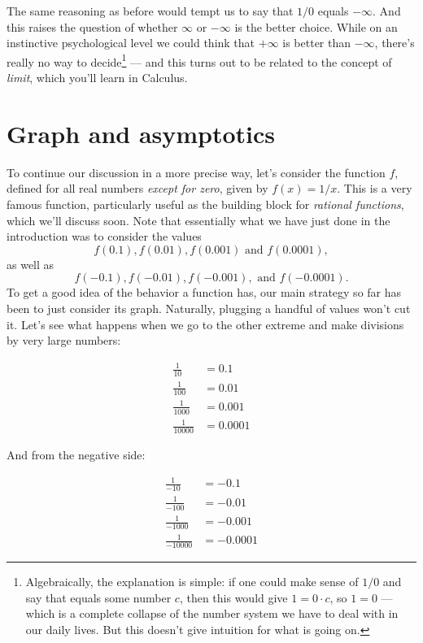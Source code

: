 \documentclass{ximera}
\begin{document}
The same reasoning as before would tempt us to say that $1/0$ equals $-\infty$. And this raises the question of whether $\infty$ or $-\infty$ is the better choice. While on an instinctive psychological level we could think that $+\infty$ is better than $-\infty$, there's really no way to decide\footnote{Algebraically, the explanation is simple: if one could make sense of $1/0$ and say that equals some number $c$, then this would give $1 = 0 \cdot c$, so $1 = 0$ --- which is a complete collapse of the number system we have to deal with in our daily lives. But this doesn't give intuition for what is going on.} --- and this turns out to be related to the concept of \emph{limit}, which you'll learn in Calculus.

\section{Graph and asymptotics}

To continue our discussion in a more precise way, let's consider the function $f$, defined for all real numbers \emph{except for zero}, given by $f(x) = 1/x$. This is a very famous function, particularly useful as the building block for \emph{rational functions}, which we'll discuss soon. Note that essentially what we have just done in the introduction was to consider the values \[   f(0.1), f(0.01), f(0.001) \mbox{ and } f(0.0001),\]as well as \[f(-0.1), f(-0.01), f(-0.001), \mbox{ and } f(-0.0001).  \]
To get a good idea of the behavior a function has, our main strategy so far has been to just consider its graph. Naturally, plugging a handful of values won't cut it. Let's see what happens when we go to the other extreme and make divisions by very large numbers:

\begin{align*}
  \frac{1}{10} &= 0.1 \\ \frac{1}{100} &= 0.01 \\ \frac{1}{1000} &= 0.001 \\ \frac{1}{10000} &= 0.0001
\end{align*}

And from the negative side:

\begin{align*}
  \frac{1}{-10} &= -0.1 \\ \frac{1}{-100} &= -0.01 \\ \frac{1}{-1000} &= -0.001 \\ \frac{1}{-10000} &= -0.0001
\end{align*}
\end{document}
